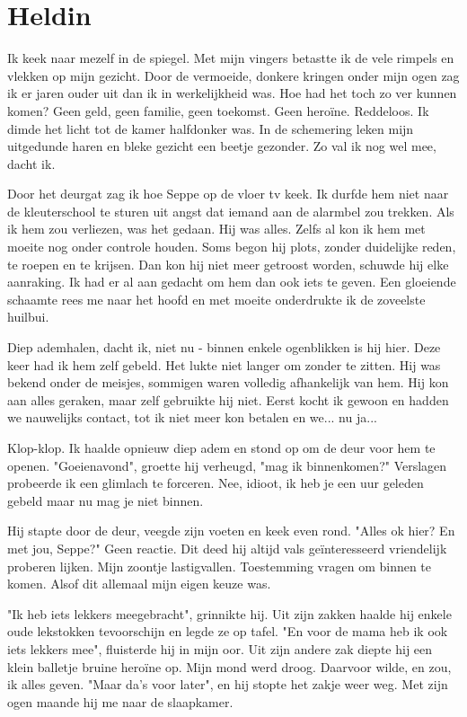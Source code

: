 \documentclass[12pt, justified, a4paper, symmetric]{tufte-book}
\begin{document}
\section{Heldin}
Ik keek naar mezelf in de spiegel. Met mijn vingers betastte ik de vele rimpels en vlekken op mijn gezicht. Door de vermoeide, donkere kringen onder mijn ogen zag ik er jaren ouder uit dan ik in werkelijkheid was. Hoe had het toch zo ver kunnen komen? Geen geld, geen familie, geen toekomst. Geen hero\"ine. Reddeloos. Ik dimde het licht tot de kamer halfdonker was. In de schemering leken mijn uitgedunde haren en bleke gezicht een beetje gezonder. Zo val ik nog wel mee, dacht ik.

Door het deurgat zag ik hoe Seppe op de vloer tv keek. Ik durfde hem niet naar de kleuterschool te sturen uit angst dat iemand aan de alarmbel zou trekken. Als ik hem zou verliezen, was het gedaan. Hij was alles. Zelfs al kon ik hem met moeite nog onder controle houden. Soms begon hij plots, zonder duidelijke reden, te roepen en te krijsen. Dan kon hij niet meer getroost worden, schuwde hij elke aanraking. Ik had er al aan gedacht om hem dan ook iets te geven. Een gloeiende schaamte rees me naar het hoofd en met moeite onderdrukte ik de zoveelste huilbui.

Diep ademhalen, dacht ik, niet nu - binnen enkele ogenblikken is hij hier. Deze keer had ik hem zelf gebeld. Het lukte niet langer om zonder te zitten. Hij was bekend onder de meisjes, sommigen waren volledig afhankelijk van hem. Hij kon aan alles geraken, maar zelf gebruikte hij niet. Eerst kocht ik gewoon en hadden we nauwelijks contact, tot ik niet meer kon betalen en we... nu ja...

Klop-klop. Ik haalde opnieuw diep adem en stond op om de deur voor hem te openen.
"Goeienavond", groette hij verheugd, "mag ik binnenkomen?" Verslagen probeerde ik een glimlach te forceren. Nee, idioot, ik heb je een uur geleden gebeld maar nu mag je niet binnen.

Hij stapte door de deur, veegde zijn voeten en keek even rond. "Alles ok hier? En met jou, Seppe?" Geen reactie. Dit deed hij altijd  vals geïnteresseerd vriendelijk proberen lijken. Mijn zoontje lastigvallen. Toestemming vragen om binnen te komen. Alsof dit allemaal mijn eigen keuze was.

"Ik heb iets lekkers meegebracht", grinnikte hij. Uit zijn zakken haalde hij enkele oude lekstokken tevoorschijn en legde ze op tafel. "En voor de mama heb ik ook iets lekkers mee", fluisterde hij in mijn oor. Uit zijn andere zak diepte hij een klein balletje bruine hero\"ine op. Mijn mond werd droog. Daarvoor wilde, en zou, ik alles geven. "Maar da's voor later", en hij stopte het zakje weer weg. Met zijn ogen maande hij me naar de slaapkamer.
\end{document}
